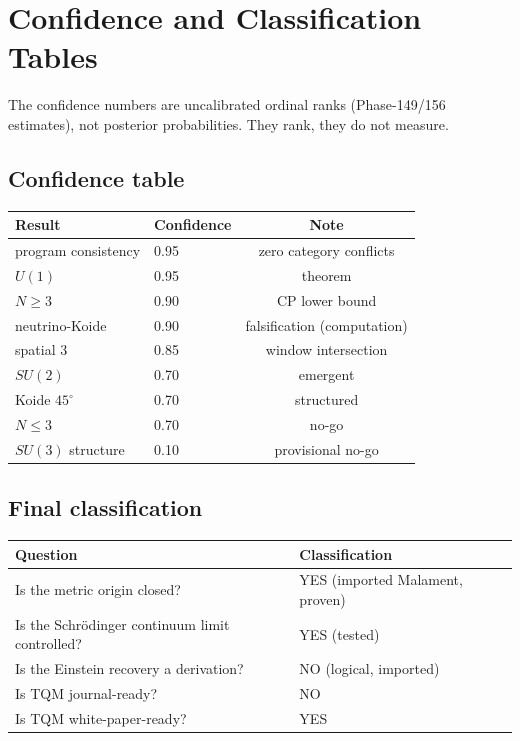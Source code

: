 \documentclass[11pt,twoside]{book}
\begin{document}
\chapter{Confidence and Classification Tables}
\label{app:confidence}

The confidence numbers are uncalibrated ordinal ranks (Phase-149/156 estimates), not
posterior probabilities. They rank, they do not measure.

\section{Confidence table}

\begin{center}
\begin{tabular}{llc}
\toprule
Result & Confidence & Note \\
\midrule
program consistency & 0.95 & zero category conflicts \\
$U(1)$ & 0.95 & theorem \\
$N\ge3$ & 0.90 & CP lower bound \\
neutrino-Koide & 0.90 & falsification (computation) \\
spatial 3 & 0.85 & window intersection \\
$SU(2)$ & 0.70 & emergent \\
Koide $45^\circ$ & 0.70 & structured \\
$N\le3$ & 0.70 & no-go \\
$SU(3)$ structure & 0.10 & provisional no-go \\
\bottomrule
\end{tabular}
\end{center}

\section{Final classification}

\begin{center}
\begin{tabular}{ll}
\toprule
Question & Classification \\
\midrule
Is the metric origin closed? & YES (imported Malament, proven) \\
Is the Schr\"odinger continuum limit controlled? & YES (tested) \\
Is the Einstein recovery a derivation? & NO (logical, imported) \\
Is TQM journal-ready? & NO \\
Is TQM white-paper-ready? & YES \\
\bottomrule
\end{tabular}
\end{center}
\end{document}
